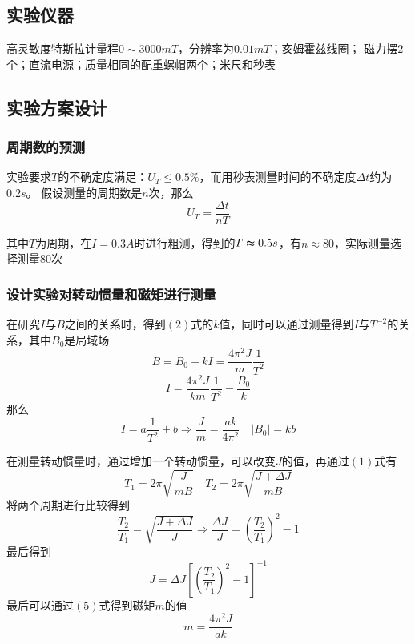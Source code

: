 \documentclass{article}
\begin{document}
\subsection{实验仪器}
高灵敏度特斯拉计量程$0\sim 3000mT$，分辨率为$0.01mT$；亥姆霍兹线圈；
磁力摆$2$个；直流电源；质量相同的配重螺帽两个；米尺和秒表
\subsection{实验方案设计}
\subsubsection*{周期数的预测}
实验要求$T$的不确定度满足：$U_T\leq 0.5\%$，而用秒表测量时间的不确定度$\Delta t$约为$0.2s$。
假设测量的周期数是$n$次，那么$$U_T=\frac{\Delta t}{nT}$$

其中$T$为周期，在$I=0.3A$时进行粗测，得到的$T\thickapprox 0.5s$，有$n\approx 80$，实际测量选择测量80次
\subsubsection*{设计实验对转动惯量和磁矩进行测量}
在研究$I$与$B$之间的关系时，得到$(2)$式的$k$值，同时可以通过测量得到$I$与$T^{-2}$的关系，其中$B_0$是局域场
\begin{equation}
    B=B_0+kI=\frac{4 \pi^2J}{m}\frac{1}{T^2}
\end{equation}
\begin{equation}
    I=\frac{4 \pi^2J}{km}\frac{1}{T^2}-\frac{B_0}{k}
\end{equation}
那么
\begin{equation}
    I=a\frac{1}{T^2}+b \Longrightarrow \frac{J}{m}=\frac{ak}{4\pi ^2} \quad |B_0|=kb
\end{equation}

在测量转动惯量时，通过增加一个转动惯量，可以改变$J$的值，再通过$(1)$式有$$T_1=2\pi \sqrt{\frac{J}{mB}} \quad T_2=2\pi \sqrt{\frac{J+\Delta J}{mB}}$$
将两个周期进行比较得到$$\frac{T_2}{T_1}=\sqrt{\frac{J+\Delta J}{J}} \Longrightarrow \frac{\Delta J}{J}=(\frac{T_2}{T_1})^2-1$$
最后得到
\begin{equation}
    J=\Delta J[(\frac{T_2}{T_1})^2-1]^{-1}
\end{equation}
最后可以通过$(5)$式得到磁矩$m$的值
\begin{equation}
    m=\frac{4\pi ^2J}{ak}
\end{equation}
\end{document}
